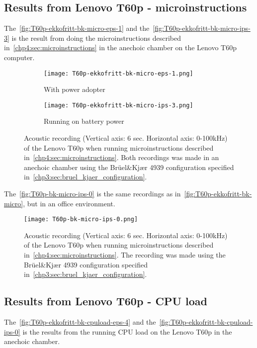 \subsection{Results from Lenovo T60p - microinstructions}\label{chp5:subsec:t60p_bk_results_micro}
The~\autoref{fig:T60p-ekkofritt-bk-micro-eps-1} and the~\autoref{fig:T60p-ekkofritt-bk-micro-ips-3} is the result from doing the microinstructions described in~\autoref{chp4:sec:microinstructions} in the anechoic chamber on the Lenovo T60p computer.
\begin{figure}[ht]
	\begin{subfigure}{0.5\textwidth}
	    \centering
	    \texttt{[image: T60p-ekkofritt-bk-micro-eps-1.png]}
	    \caption{With power adopter}
	    \label{fig:T60p-ekkofritt-bk-micro-eps-1}
    \end{subfigure}
    \begin{subfigure}{0.5\textwidth}
	    \centering
    	\texttt{[image: T60p-ekkofritt-bk-micro-ips-3.png]}
    	\caption{Running on battery power}
    	\label{fig:T60p-ekkofritt-bk-micro-ips-3}
    \end{subfigure}
    \caption{Acoustic recording (Vertical axis: 6 sec. Horizontal axis: 0-100kHz) of the Lenovo T60p when running microinstructions described in~\autoref{chp4:sec:microinstructions}. Both recordings was made in an anechoic chamber using the Brüel\&Kjær 4939 configuration specified in~\autoref{chp3:sec:bruel_kjaer_configuration}. }
	\label{fig:T60p-ekkofritt-bk-micro}
\end{figure}
The~\autoref{fig:T60p-bk-micro-ips-0} is the same recordings as in~\autoref{fig:T60p-ekkofritt-bk-micro}, but in an office environment.
\begin{figure}[ht]
    \centering
    \texttt{[image: T60p-bk-micro-ips-0.png]}
    \caption{Acoustic recording (Vertical axis: 6 sec. Horizontal axis: 0-100kHz) of the Lenovo T60p when running microinstructions described in~\autoref{chp4:sec:microinstructions}. The recording was made using the Brüel\&Kjær 4939 configuration specified in~\autoref{chp3:sec:bruel_kjaer_configuration}. }
    \label{fig:T60p-bk-micro-ips-0}
\end{figure}

\subsection{Results from Lenovo T60p - CPU load}\label{chp5:subsec:t60p_bk_results_cpuload}
The~\autoref{fig:T60p-ekkofritt-bk-cpuload-eps-4} and the~\autoref{fig:T60p-ekkofritt-bk-cpuload-ips-0} is the results from the running CPU load on the Lenovo T60p in the anechoic chamber. 

